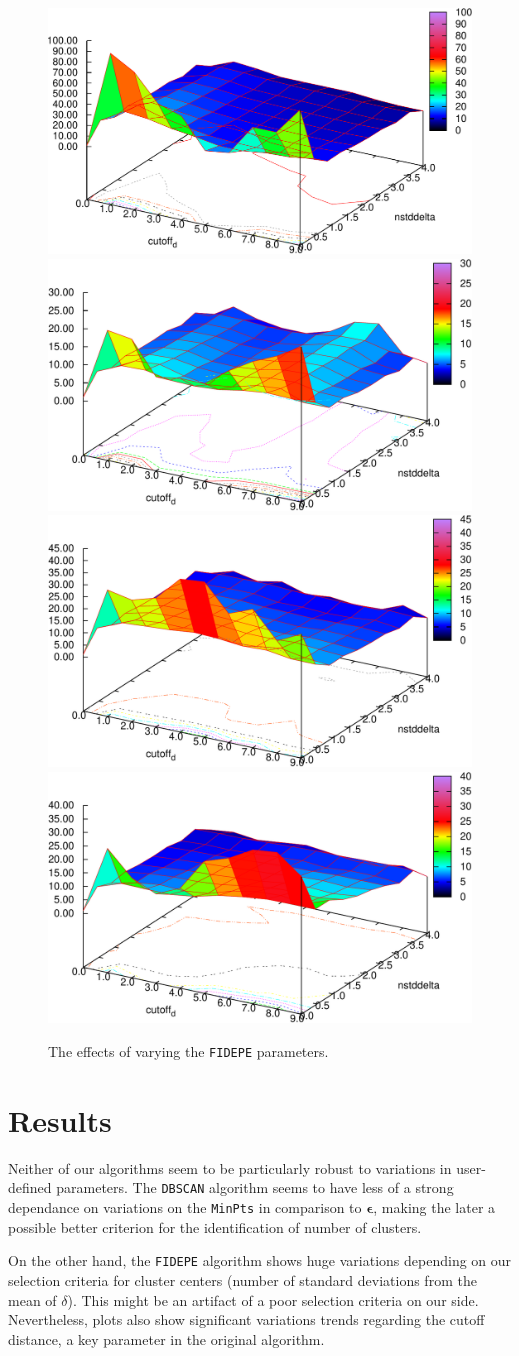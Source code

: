 \documentclass[12pt]{article}
\begin{document}
\begin{figure}[ht]
\centering
\includegraphics[width=0.47\linewidth]{../plots/fidepe/Aggregation_3d-crop}
\includegraphics[width=0.47\linewidth]{../plots/fidepe/Compound_3d-crop} \\
\includegraphics[width=0.47\linewidth]{../plots/fidepe/jain_3d-crop}
\includegraphics[width=0.47\linewidth]{../plots/fidepe/spiral_3d-crop}
\caption{The effects of varying the \texttt{FIDEPE} parameters.}
\label{fig:FIDPEPEplots}
\end{figure}
\restoregeometry
\doublespacing


\section{Results}

\par Neither of our algorithms seem to be particularly robust to variations in user-defined parameters. The \texttt{DBSCAN} algorithm seems to have less of a strong dependance on variations on the \texttt{MinPts} in comparison to $\boldsymbol{\epsilon}$, making the later a possible better criterion for the identification of number of clusters.
\par On the other hand, the \texttt{FIDEPE} algorithm shows huge variations depending on our selection criteria for cluster centers (number of standard deviations from the mean of $\delta$). This might be an artifact of a poor selection criteria on our side. Nevertheless, plots also show significant variations trends regarding the cutoff distance, a key parameter in the original algorithm.
\end{document}
